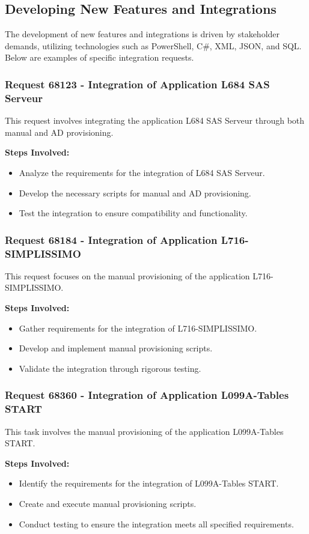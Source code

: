 \subsection{Developing New Features and Integrations}

The development of new features and integrations is driven by stakeholder demands, utilizing technologies such as PowerShell, C\#, XML, JSON, and SQL. Below are examples of specific integration requests.

\subsubsection{Request 68123 - Integration of Application L684 SAS Serveur}

This request involves integrating the application L684 SAS Serveur through both manual and AD provisioning.

\textbf{Steps Involved:}
\begin{itemize}
    \item Analyze the requirements for the integration of L684 SAS Serveur.
    \item Develop the necessary scripts for manual and AD provisioning.
    \item Test the integration to ensure compatibility and functionality.
\end{itemize}

\subsubsection{Request 68184 - Integration of Application L716-SIMPLISSIMO}

This request focuses on the manual provisioning of the application L716-SIMPLISSIMO.

\textbf{Steps Involved:}
\begin{itemize}
    \item Gather requirements for the integration of L716-SIMPLISSIMO.
    \item Develop and implement manual provisioning scripts.
    \item Validate the integration through rigorous testing.
\end{itemize}

\subsubsection{Request 68360 - Integration of Application L099A-Tables START}

This task involves the manual provisioning of the application L099A-Tables START.

\textbf{Steps Involved:}
\begin{itemize}
    \item Identify the requirements for the integration of L099A-Tables START.
    \item Create and execute manual provisioning scripts.
    \item Conduct testing to ensure the integration meets all specified requirements.
\end{itemize}


